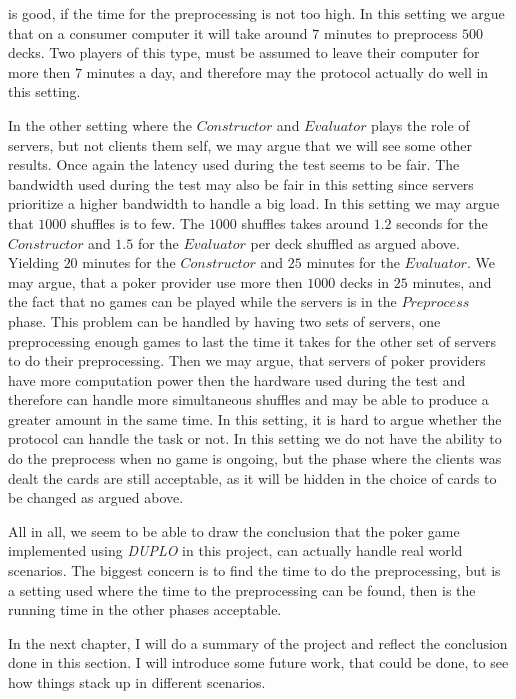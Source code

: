 \documentclass[twoside,11pt,openright]{report}
\newcommand{\DUPLO}{\textit{DUPLO} }
\begin{document}
is good, if the time for the preprocessing is not too high. In this setting we argue that on a consumer computer it will take around $7$ minutes to preprocess $500$ decks. Two players of this type, must be assumed to leave their computer for more then $7$ minutes a day, and therefore may the protocol actually do well in this setting.

In the other setting where the $Constructor$ and $Evaluator$ plays the role of servers, but not clients them self, we may argue that we will see some other results. Once again the latency used during the test seems to be fair. The bandwidth used during the test may also be fair in this setting since servers prioritize a higher bandwidth to handle a big load. In this setting we may argue that $1000$ shuffles is to few.  The $1000$ shuffles takes around $1.2$ seconds for the $Constructor$ and $1.5$ for the $Evaluator$ per deck shuffled as argued above. Yielding $20$ minutes for the $Constructor$ and $25$ minutes for the $Evaluator$. We may argue, that a poker provider use more then $1000$ decks in $25$ minutes, and the fact that no games can be played while the servers is in the $Preprocess$ phase. This problem can be handled by having two sets of servers, one preprocessing enough games to last the time it takes for the other set of servers to do their preprocessing. Then we may argue, that servers of poker providers have more computation power then the hardware used during the test and therefore can handle more simultaneous shuffles and may be able to produce a greater amount in the same time. In this setting, it is hard to argue whether the protocol can handle the task or not. In this setting we do not have the ability to do the preprocess when no game is ongoing, but the phase where the clients was dealt the cards are still acceptable, as it will be hidden in the choice of cards to be changed as argued above.

\bigskip

All in all, we seem to be able to draw the conclusion that the poker game implemented using \DUPLO in this project, can actually handle real world scenarios. The biggest concern is to find the time to do the preprocessing, but is a setting used where the time to the preprocessing can be found, then is the running time in the other phases acceptable.

In the next chapter, I will do a summary of the project and reflect the conclusion done in this section. I will introduce some future work, that could be done, to see how things stack up in different scenarios.
\end{document}
